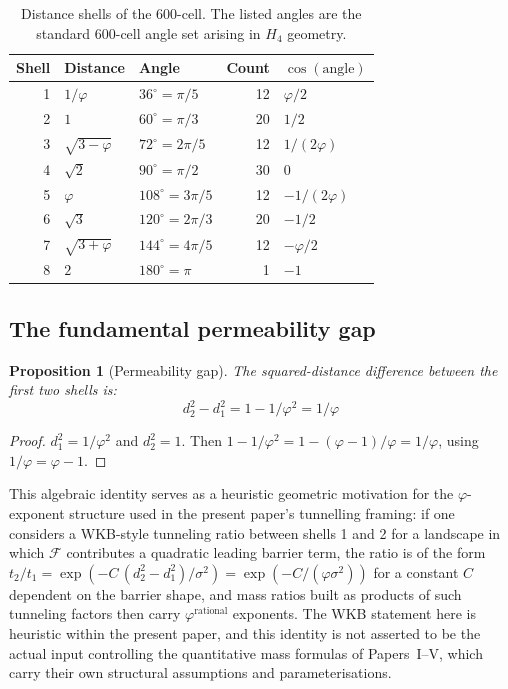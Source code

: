 \documentclass[12pt]{article}
\newtheorem{proposition}[theorem]{Proposition}
\newcommand{\Fcal}{\mathcal{F}}
\begin{document}
\begin{table}[ht]
\centering
\caption{Distance shells of the 600-cell. The listed angles are the standard 600-cell angle set arising in $H_4$ geometry.}
\label{tab:shells}
\begin{tabular}{@{}rllrl@{}}
\toprule
Shell & Distance & Angle & Count & $\cos(\text{angle})$ \\
\midrule
1 & $1/\varphi$ & $36^\circ = \pi/5$ & 12 & $\varphi/2$ \\
2 & $1$ & $60^\circ = \pi/3$ & 20 & $1/2$ \\
3 & $\sqrt{3-\varphi}$ & $72^\circ = 2\pi/5$ & 12 & $1/(2\varphi)$ \\
4 & $\sqrt{2}$ & $90^\circ = \pi/2$ & 30 & $0$ \\
5 & $\varphi$ & $108^\circ = 3\pi/5$ & 12 & $-1/(2\varphi)$ \\
6 & $\sqrt{3}$ & $120^\circ = 2\pi/3$ & 20 & $-1/2$ \\
7 & $\sqrt{3+\varphi}$ & $144^\circ = 4\pi/5$ & 12 & $-\varphi/2$ \\
8 & $2$ & $180^\circ = \pi$ & 1 & $-1$ \\
\bottomrule
\end{tabular}
\end{table}

\subsection{The fundamental permeability gap}

\begin{proposition}[Permeability gap]\label{prop:gap}
The squared-distance difference between the first two shells is:
\begin{equation}\label{eq:gap}
    d_2^2 - d_1^2 = 1 - 1/\varphi^2 = 1/\varphi
\end{equation}
\end{proposition}

\begin{proof}
$d_1^2 = 1/\varphi^2$ and $d_2^2 = 1$. Then $1 - 1/\varphi^2 = 1 - (\varphi-1)/\varphi = 1/\varphi$, using $1/\varphi = \varphi - 1$.
\end{proof}

This algebraic identity serves as a heuristic geometric motivation for the $\varphi$-exponent structure used in the present paper's tunnelling framing: if one considers a WKB-style tunneling ratio between shells 1 and 2 for a landscape in which $\Fcal$ contributes a quadratic leading barrier term, the ratio is of the form $t_2/t_1 = \exp(-C\,(d_2^2 - d_1^2)/\sigma^2) = \exp(-C/(\varphi\sigma^2))$ for a constant $C$ dependent on the barrier shape, and mass ratios built as products of such tunneling factors then carry $\varphi^{\text{rational}}$ exponents. The WKB statement here is heuristic within the present paper, and this identity is not asserted to be the actual input controlling the quantitative mass formulas of Papers~I--V, which carry their own structural assumptions and parameterisations.
\end{document}
